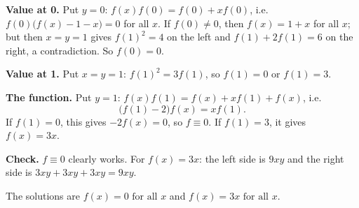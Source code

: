 \textbf{Value at 0.} Put $y=0$: $f(x)f(0)=f(0)+xf(0)$, i.e. $f(0)\bigl(f(x)-1-x\bigr)=0$ for all $x$. If $f(0)\ne0$, then $f(x)=1+x$ for all $x$; but then $x=y=1$ gives $f(1)^2=4$ on the left and $f(1)+2f(1)=6$ on the right, a contradiction. So $f(0)=0$.

\textbf{Value at 1.} Put $x=y=1$: $f(1)^2=3f(1)$, so $f(1)=0$ or $f(1)=3$.

\textbf{The function.} Put $y=1$: $f(x)f(1)=f(x)+xf(1)+f(x)$, i.e.
\[\bigl(f(1)-2\bigr)f(x)=xf(1).\]
If $f(1)=0$, this gives $-2f(x)=0$, so $f\equiv0$. If $f(1)=3$, it gives $f(x)=3x$.

\textbf{Check.} $f\equiv0$ clearly works. For $f(x)=3x$: the left side is $9xy$ and the right side is $3xy+3xy+3xy=9xy$.

The solutions are $\boxed{f(x)=0\text{ for all }x}$ and $\boxed{f(x)=3x\text{ for all }x}$.
